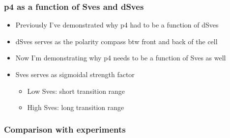 





\iffalse
\plotslide{Constant p4}{constant_p4_func.pdf}
\plotslide{Constant p4}{p4a_sign_change_Sves.pdf}
\plotslide{Constant p4}{p4a_sign_change_MI.pdf}

\begin{frame}
  \frametitle{Constant p4}
  \begin{itemize}
    \item Positive amp is good for native
    \item Negative amp is good for overexpressed
    \item Smoothly change amp w.r.t expression level
  \end{itemize}
\end{frame}

\plotslide{Coupled p4}{coupled_p4_func.pdf}
\plotslide{Coupled p4}{Sves_coupled_p4.pdf}
\plotslide{Coupled p4}{MI_coupled_p4.pdf}

\fi





\begin{frame}[label=test]
  \frametitle{p4 as a function of Sves and dSves}
  \begin{itemize}
    \itemsep3em
    \item Previously I've demonstrated why p4 had to be a function of dSves
    \item dSves serves as the polarity compass btw front and back of the cell
    \item Now I'm demonstrating why p4 needs to be a function of Sves as
      well
    \item Sves serves as sigmoidal strength factor
      \begin{itemize}
          \item Low Sves: short transition range
          \item High Sves: long transition range
      \end{itemize}
  \end{itemize}
\end{frame}

\begin{frame}
  \frametitle{Comparison with experiments}
\end{frame}

